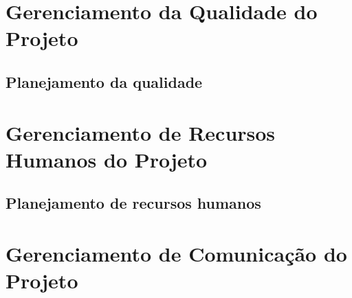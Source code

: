 \chapter{Gerenciamento da Qualidade do Projeto}



    \section{Planejamento da qualidade}



\chapter{Gerenciamento de Recursos Humanos do Projeto}



    \section{Planejamento de recursos humanos}



\chapter{Gerenciamento de Comunicação do Projeto}



